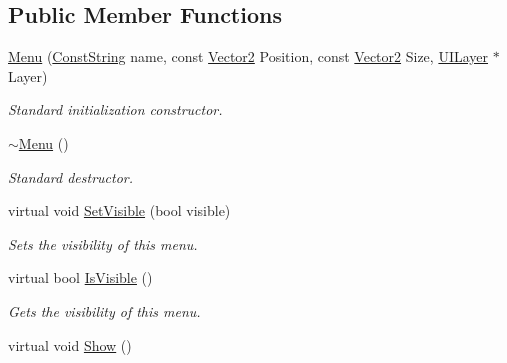 \subsection*{Public Member Functions}
\begin{DoxyCompactItemize}
\item 
\hyperlink{classphys_1_1UI_1_1Menu_af7dfd6dd92b4477cdc4df7ed4bf5499c}{Menu} (\hyperlink{namespacephys_a5ce5049f8b4bf88d6413c47b504ebb31}{ConstString} name, const \hyperlink{classphys_1_1Vector2}{Vector2} Position, const \hyperlink{classphys_1_1Vector2}{Vector2} Size, \hyperlink{classphys_1_1UILayer}{UILayer} $\ast$Layer)
\begin{DoxyCompactList}\small\item\em Standard initialization constructor. \item\end{DoxyCompactList}\item 
\hypertarget{classphys_1_1UI_1_1Menu_a54b60c45238a3655da9dfa83104adb18}{
\hyperlink{classphys_1_1UI_1_1Menu_a54b60c45238a3655da9dfa83104adb18}{$\sim$Menu} ()}
\label{d6/dd3/classphys_1_1UI_1_1Menu_a54b60c45238a3655da9dfa83104adb18}

\begin{DoxyCompactList}\small\item\em Standard destructor. \item\end{DoxyCompactList}\item 
virtual void \hyperlink{classphys_1_1UI_1_1Menu_a4847e0de055a9c2f708f98742fa59a87}{SetVisible} (bool visible)
\begin{DoxyCompactList}\small\item\em Sets the visibility of this menu. \item\end{DoxyCompactList}\item 
virtual bool \hyperlink{classphys_1_1UI_1_1Menu_ae23321617d7e14448e2fab3b455c3dc7}{IsVisible} ()
\begin{DoxyCompactList}\small\item\em Gets the visibility of this menu. \item\end{DoxyCompactList}\item 
\hypertarget{classphys_1_1UI_1_1Menu_aeb6373cc1be7da0bf5966129f271c861}{
virtual void \hyperlink{classphys_1_1UI_1_1Menu_aeb6373cc1be7da0bf5966129f271c861}{Show} ()}
\label{d6/dd3/classphys_1_1UI_1_1Menu_aeb6373cc1be7da0bf5966129f271c861}


\end{DoxyCompactItemize}
